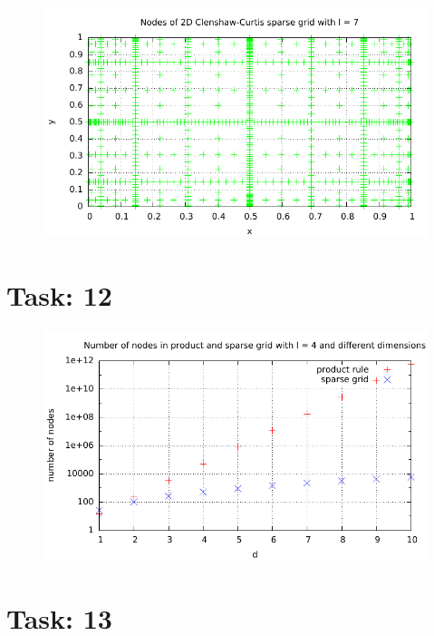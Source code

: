 \documentclass{article}
\begin{document}
\begin{figure}[htbp]
  \centering
     \includegraphics[width=1.0\textwidth]{../Task11/sh3_task11_point_plot_clenshawCurtis_l=7.pdf}
\end{figure}
\newpage
\section*{Task: 12}

\begin{figure}[htbp]
  \centering
     \includegraphics[width=1.0\textwidth]{../Task12/sh3_task12_num_of_nodes.pdf}
\end{figure}

\section*{Task: 13}
\end{document}
